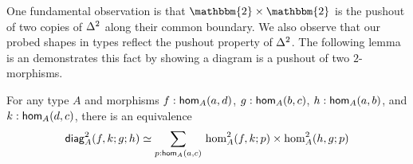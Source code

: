 \documentclass[main.tex]{subfiles}
\begin{document}
One fundamental observation is that $\mathbbm{2} \times \mathbbm{2}$ is the pushout of two copies of $\tsx$ along their common boundary.
We also observe that our probed shapes in types reflect the pushout property of $\tsx$. The following lemma
 is an demonstrates this fact by showing a diagram is a pushout of two $2$-morphisms.
\begin{lemma}
    For any type $A$ and morphisms $f : \ho[A]{a}{d}$, $g : \ho[A]{b}{c}$, $h : \ho[A]{a}{b}$, and $k : \ho[A]{d}{c}$, there is an equivalence 
    \begin{equation}
        \label{eqn:squareistwotriangles}
        \diagshort{A}(a,b,c,d,f,k,g,h) \simeq \sm{p : \ho[A]{a}{c}}\homtwoshort{A}(a,d,c,f,k,p) \times \homtwoshort{A}(a,b,c,h,g,p) 
    \end{equation} 
\end{lemma}
\end{document}
